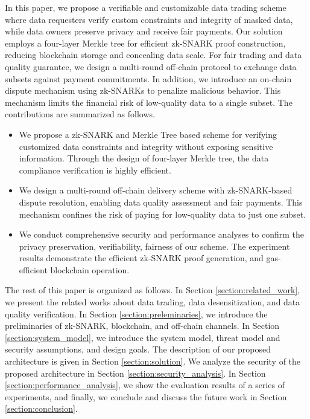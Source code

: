 \documentclass[journal]{IEEEtran}
\begin{document}
In this paper, we propose a verifiable and customizable data trading scheme where data requesters verify custom constraints and integrity of masked data, while data owners preserve privacy and receive fair payments. Our solution employs a four-layer Merkle tree for efficient zk-SNARK proof construction, reducing blockchain storage and concealing data scale. For fair trading and data quality guarantee, we design a multi-round off-chain protocol to exchange data subsets against payment commitments. In addition, we introduce an on-chain dispute mechanism using zk-SNARKs to penalize malicious behavior. This mechanism limits the financial risk of low-quality data to a single subset. The contributions  are summarized as follows.
\begin{itemize}
    \item We propose a zk-SNARK and Merkle Tree based scheme for verifying customized data constraints and integrity without exposing sensitive information. Through the design of four-layer Merkle tree, the data compliance verification is highly efficient. 
    \item We design a multi-round off-chain delivery scheme with zk-SNARK-based dispute resolution, enabling  data quality assessment and fair payments. This mechanism confines the risk of paying for low-quality data to just one subset.
    \item We conduct comprehensive security and performance analyses to confirm the privacy preservation, verifiability, fairness of our scheme. The experiment results demonstrate the efficient zk-SNARK proof generation, and gas-efficient blockchain operation.
\end{itemize}  

The rest of this paper is organized as follows.
In Section \ref{section:related_work}, we present the related works about data trading, data desensitization, and data quality verification.
In Section \ref{section:preleminaries}, we introduce the preliminaries of zk-SNARK, blockchain, and off-chain channels.
In Section \ref{section:system_model}, we introduce the system model, threat model and security assumptions, and design goals.
The description of our proposed architecture is given in Section \ref{section:solution}.
We analyze the security of the proposed architecture in Section \ref{section:security_analysis}.
In Section \ref{section:performance_analysis}, we show the evaluation results of a series of experiments, and finally, we conclude and discuss the future work in Section \ref{section:conclusion}.
\end{document}
